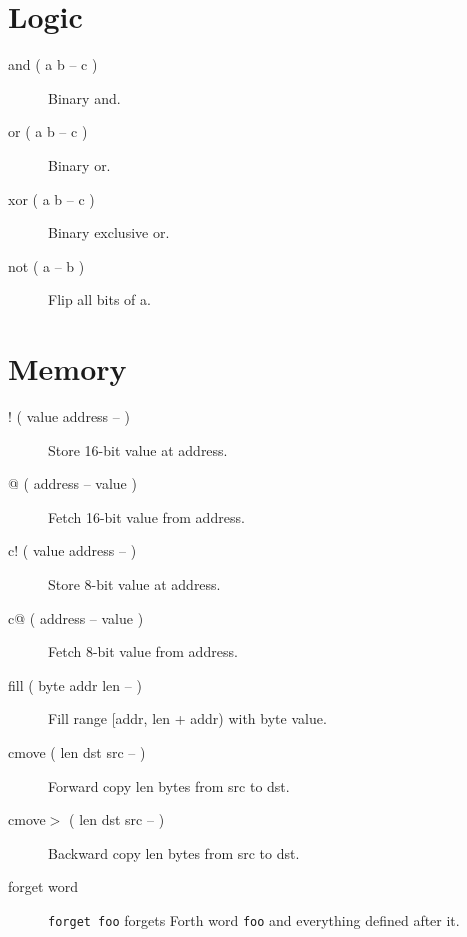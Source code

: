 \section{Logic}

\begin{description}
\item[and ( a b -- c )]

Binary and.

\item[or ( a b -- c )]

Binary or.

\item[xor ( a b -- c )]

Binary exclusive or.

\item[not ( a -- b )]

Flip all bits of a.

\end{description}

\section{Memory}

\begin{description}
\item[! ( value address -- )]

Store 16-bit value at address.

\item[@ ( address -- value )]

Fetch 16-bit value from address.

\item[c! ( value address -- )]

Store 8-bit value at address.

\item[c@ ( address -- value )]

Fetch 8-bit value from address.

\item[fill ( byte addr len -- )]

Fill range [addr, len + addr) with byte value.

\item[cmove ( len dst src -- )]

Forward copy len bytes from src to dst.

\item[cmove$>$ ( len dst src -- )]

Backward copy len bytes from src to dst.

\item[forget word]

\texttt{forget foo} forgets Forth word \texttt{foo} and everything defined after it.

\end{description}

